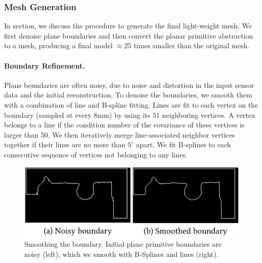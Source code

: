 \subsubsection{Mesh Generation}
\label{sec:approach-mesh}
In section, we discuss the procedure to generate the final light-weight mesh. 
We first denoise plane boundaries and then convert the planar primitive abstraction to a mesh, producing a final model $\approx 25$ times smaller than the original mesh.

\paragraph*{Boundary Refinement.}
Plane boundaries are often noisy, due to noise and distortion in the input sensor data and the initial reconstruction.
To denoise the boundaries, we smooth them with a combination of line and B-spline fitting.
Lines are fit to each vertex on the boundary (sampled at every 8mm) by using its $51$ neighboring vertices. 
A vertex belongs to a line if the condition number of the covariance of these vertices is larger than 50.
We then iteratively merge line-associated neighbor vertices together if their lines are no more than $5^\circ$ apart.
We fit B-splines to each consecutive sequence of vertices not belonging to any lines.

\begin{figure}
\centering
\includegraphics[width=0.75\linewidth]{3dlite/fig11.png}
\caption{Smoothing the boundary. Initial plane primitive boundaries are noisy (left), which we smooth with B-Splines and lines (right).}
\label{fig:boundary-fit}
\end{figure}

